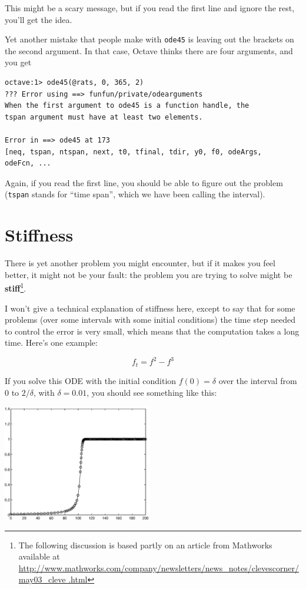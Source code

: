 \documentclass{book}
\begin{document}
This might be a scary message, but if you read the first line
and ignore the rest, you'll get the idea.

Yet another mistake that people make with {\tt ode45} is leaving
out the brackets on the second argument. In that case, Octave
thinks there are four arguments, and you get

\begin{verbatim}
octave:1> ode45(@rats, 0, 365, 2)
??? Error using ==> funfun/private/odearguments
When the first argument to ode45 is a function handle, the 
tspan argument must have at least two elements.

Error in ==> ode45 at 173
[neq, tspan, ntspan, next, t0, tfinal, tdir, y0, f0, odeArgs, 
odeFcn, ...
\end{verbatim}

Again, if you read the first line, you should be able to figure
out the problem ({\tt tspan} stands for ``time span'', which we
have been calling the interval).


\section{Stiffness}

There is yet another problem you might encounter, but if it makes you
feel better, it might not be your fault: the problem you are trying to
solve might be {\bf stiff}\footnote{The following discussion is based
partly on an article from Mathworks available at
\url{
http://www.mathworks.com/company/newsletters/news_notes/clevescorner/may03_cleve
.html}}.

I won't give a technical explanation of stiffness here, except
to say that for some problems (over some intervals with some initial
conditions) the time step needed to control the error is very small,
which means that the computation takes a long time. Here's one
example:

\[ f_t = f^2 - f^3 \]

If you solve this ODE with the initial condition $f(0) = \delta$ over
the interval from 0 to $2/\delta$, with $\delta = 0.01$, you should
see something like this:

\beforefig \centerline{\includegraphics[height=2in]{figs/stiff.eps}}
\end{document}
